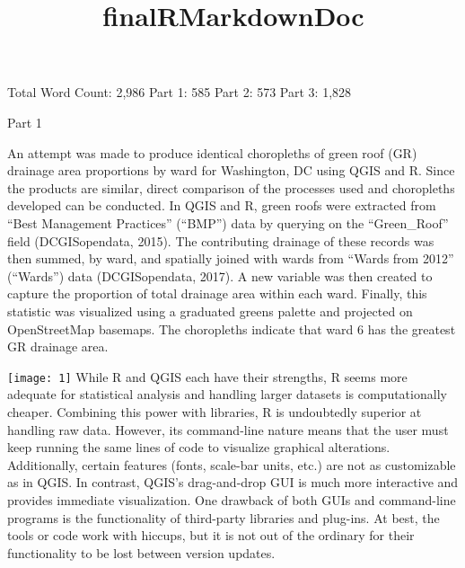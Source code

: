 \documentclass[]{article}
\title{finalRMarkdownDoc}
\author{}
\date{}
\begin{document}
\maketitle

Total Word Count: 2,986 Part 1: 585 Part 2: 573 Part 3: 1,828

Part 1

An attempt was made to produce identical choropleths of green roof (GR)
drainage area proportions by ward for Washington, DC using QGIS and R.
Since the products are similar, direct comparison of the processes used
and choropleths developed can be conducted. In QGIS and R, green roofs
were extracted from ``Best Management Practices'' (``BMP'') data by
querying on the ``Green\_Roof'' field (DCGISopendata, 2015). The
contributing drainage of these records was then summed, by ward, and
spatially joined with wards from ``Wards from 2012'' (``Wards'') data
(DCGISopendata, 2017). A new variable was then created to capture the
proportion of total drainage area within each ward. Finally, this
statistic was visualized using a graduated greens palette and projected
on OpenStreetMap basemaps. The choropleths indicate that ward 6 has the
greatest GR drainage area.

\texttt{[image: 1]} While R and QGIS each have their
strengths, R seems more adequate for statistical analysis and handling
larger datasets is computationally cheaper. Combining this power with
libraries, R is undoubtedly superior at handling raw data. However, its
command-line nature means that the user must keep running the same lines
of code to visualize graphical alterations. Additionally, certain
features (fonts, scale-bar units, etc.) are not as customizable as in
QGIS. In contrast, QGIS's drag-and-drop GUI is much more interactive and
provides immediate visualization. One drawback of both GUIs and
command-line programs is the functionality of third-party libraries and
plug-ins. At best, the tools or code work with hiccups, but it is not
out of the ordinary for their functionality to be lost between version
updates.
\end{document}
